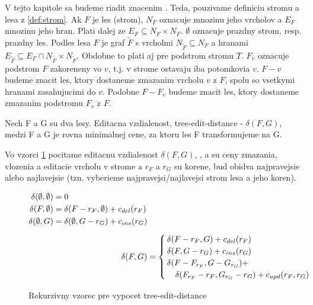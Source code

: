 V tejto kapitole sa budeme riadit znacenim \citet{RTED}. Teda, pouzivame definiciu
stromu a lesa z \ref{def:strom}. Ak $F$ je les (strom), $N_F$ oznacuje mnozinu jeho vrcholov a $E_F$
mnozinu jeho hran. Plati dalej ze $E_F \subseteq N_F \times N_F$. $\emptyset$ oznacuje
prazdny strom, resp. prazdny les. Podles lesa $F$ je graf $\tilde{F}$ s vrcholmi
$N_{\tilde{F}} \subseteq N_F$ a hranami $E_{\tilde{F}} \subseteq E_F \cap N_{\tilde{F}} \times N_{\tilde{F}}$.
Obdobne to plati aj pre podstrom stromu $T$.
$F_{v}$ oznacuje podstrom $F$ zakoreneny vo $v$, t.j. v strome ostavaju iba potomkovia $v$.
$F - v$ budeme znacit les, ktory dostaneme zmazanim vrcholu $v$ z $F$, spolu so vsetkymi hranami
zasahujucimi do $v$. Podobne $F - F_{v}$ budeme znacit les, ktory dostaneme zmazanim podstromu
$F_{v}$ z $F$.

\begin{definice}
	Nech F a G su dva lesy. Editacna vzdialenost, tree-edit-distance - $\delta(F, G)$,
	medzi F a G je rovna minimalnej cene, za ktoru les F transformujeme na G.
\end{definice}

Vo vzorci \ref{eq:ted} pocitame editacnu vzdialenost $\delta(F, G)$,
\Cdel, \Cins a \Cupd su ceny zmazania, vlozenia a editacie vrcholu v strome
a $r_{F}$ a $r_{G}$ su korene, bud obidva najpravejsie alebo najlavejsie (tzn. vyberieme
najpravejsi/najlavejsi strom lesa a jeho koren).

\begin{figure}[H]\label{eq:ted}
\begin{subequations}
\begin{align}
	\begin{split}
	\delta(\emptyset, \emptyset) &=
		0
		\\
	\delta(F, \emptyset) &=
		\delta(F - r_{F}, \emptyset) + c_{del}(r_{F})
		\\
	\delta(\emptyset, G) &=
		\delta(\emptyset, G - r_{G}) + c_{ins}(r_{G})
	\end{split}
	\\[1ex]
	\delta(F, G) &=
		\begin{cases}
			\delta(F - r_{F}, G) + c_{del}(r_{F}) \\
			\delta(F, G - r_{G}) + c_{ins}(r_{G}) \\
			\delta(F - F_{r_{F}}, G - G_{r_{G}}) + \\
				\quad \delta(F_{r_{F}} - r_{F}, G_{r_{G}} - r_{G}) + c_{upd}(r_{F}, r_{G})
		\end{cases}
\end{align}
\end{subequations}
\caption{Rekurzivny vzorec pre vypocet tree-edit-distance}
\end{figure}


